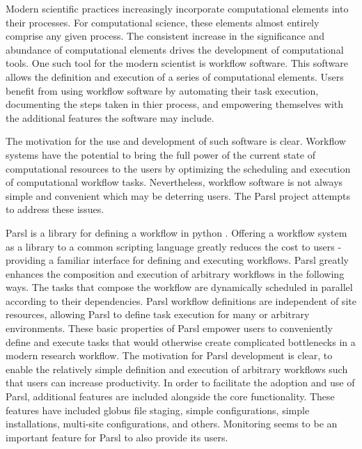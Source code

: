 Modern scientific practices increasingly incorporate computational elements into their processes.
For computational science, these elements almost entirely comprise any given process.
The consistent increase in the significance and abundance of computational elements drives the development of computational tools.
One such tool for the modern scientist is workflow software.
This software allows the definition and execution of a series of computational elements.
Users benefit from using workflow software by automating their task execution, documenting the steps taken in thier process, and empowering themselves with the additional features the software may include.

The motivation for the use and development of such software is clear.
Workflow systems have the potential to bring the full power of the current state of computational resources to the users by optimizing the scheduling and execution of computational workflow tasks.
Nevertheless, workflow software is not always simple and convenient which may be deterring users.
The Parsl project attempts to address these issues.

Parsl is a library for defining a workflow in python \cite{Parsl}.
Offering a workflow system as a library to a common scripting language greatly reduces the cost to users - providing a familiar interface for defining and executing workflows.
Parsl greatly enhances the composition and execution of arbitrary workflows in the following ways.
The tasks that compose the workflow are dynamically scheduled in parallel according to their dependencies.
Parsl workflow definitions are independent of site resources, allowing Parsl to define task execution for many or arbitrary environments.
These basic properties of Parsl empower users to conveniently define and execute tasks that would otherwise create complicated bottlenecks in a modern research workflow.
The motivation for Parsl development is clear, to enable the relatively simple definition and execution of arbitrary workflows such that users can increase productivity.
In order to facilitate the adoption and use of Parsl, additional features are included alongside the core functionality.
These features have included globus file staging, simple configurations, simple installations, multi-site configurations, and others.
Monitoring seems to be an important feature for Parsl to also provide its users.

